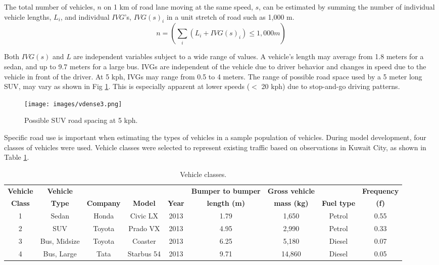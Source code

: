The total number of vehicles, $n$ on 1 km of road lane moving at the same speed, $s$, can be estimated by summing the number of individual vehicle lengths, $L_{i}$, and individual $IVG$'s, $IVG(s)_{i}$ in a unit stretch of road such as 1,000 m. 
\begin{equation}
\label{eq1:roadspace}
n =  \left ( \sum_{i}\left ({L_{i} + IVG(s)_{i}} \right )\leq 1,000m   \right ) 
\end{equation}

Both $IVG(s)$ and $L$ are independent variables subject to a wide range of values.  A vehicle’s length may average from 1.8 meters for a sedan, and up to 9.7 meters for a large bus.  IVGs are independent of the vehicle due to driver behavior and changes in speed due to the vehicle in front of the driver.  At 5 kph, IVGs may range from 0.5 to 4 meters.  The range of possible road space used by a 5 meter long SUV, may vary as shown in Fig \ref{fig3:SUVspace}.  This is especially apparent at lower speeds ($<$ 20 kph) due to stop-and-go driving patterns.  

%
\begin{figure}
\texttt{[image: images/vdense3.png]} 
\caption{Possible SUV road spacing at 5 kph.}
\label{fig3:SUVspace}
\end{figure}
%

Specific road use is important when estimating the types of vehicles in a sample population of vehicles.  During model development, four classes of vehicles were used.  Vehicle classes were selected to represent existing traffic based on observations in Kuwait City, as shown in Table \ref{tb1:vehicletypes}.

\begin{table}[]
\centering
\caption{Vehicle classes.}
\label{tb1:vehicletypes}
\begin{tabular}{@{}ccccccccc@{}}
\toprule
\textbf{Vehicle} & \textbf{Vehicle} & \textbf{} & \textbf{} & \textbf{} & \textbf{Bumper to bumper} & \textbf{Gross vehicle} & \textbf{} & \textbf{Frequency} \\ 
\textbf{Class} & \textbf{Type} & \textbf{Company} & \textbf{Model} & \textbf{Year} & \textbf{length (m)} & \textbf{mass (kg)} & \textbf{Fuel type} & \textbf{(f)} \\ \midrule
1 & Sedan & Honda & Civic LX & 2013 & 1.79 & 1,650 & Petrol & 0.55 \\
2 & SUV & Toyota & Prado VX & 2013 & 4.95 & 2,990 & Petrol & 0.33 \\
3 & Bus, Midsize & Toyota & Coaster & 2013 & 6.25 & 5,180 & Diesel & 0.07 \\
4 & Bus, Large & Tata & Starbus 54 & 2013 & 9.71 & 14,860 & Diesel & 0.05 \\ \bottomrule
\end{tabular}
\end{table}

